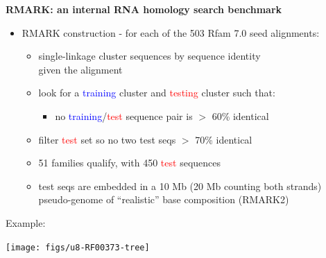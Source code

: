 \documentclass[landscape]{slides}
\begin{document}
\begin{slide}
\begin{center}
\textbf{RMARK: an internal RNA homology search benchmark}
\end{center}
\medskip
\begin{minipage}{7in}
\small
\begin{itemize}
\item
  RMARK construction - for each of the 503 Rfam 7.0 seed alignments:
  \begin{itemize}
  \item 
    single-linkage cluster sequences by sequence identity \\ given the alignment
  \item 
    look for a \textcolor{blue}{training} cluster and
    \textcolor{red}{testing} cluster such that: 
    \begin{itemize}
    \item
      no \textcolor{blue}{training}/\textcolor{red}{test} sequence pair is $>$ 60\% identical
    \end{itemize}
  \item
    filter \textcolor{red}{test} set so no two test seqs $>$ 70\% identical 
  \item
    51 families qualify, with 450 \textcolor{red}{test} sequences
  \item
    test seqs are embedded in a 10 Mb (20 Mb counting both strands) pseudo-genome of ``realistic''
    base composition (RMARK2)
  \end{itemize}
\end{itemize}
\vspace{1.0in}
\end{minipage}
\hspace{0.1in}
\begin{minipage}{3.5in}
  Example: 
\vspace{0.2in}

\begin{center}
\texttt{[image: figs/u8-RF00373-tree]}

\end{center}
\end{minipage}
\end{slide}
\end{document}
